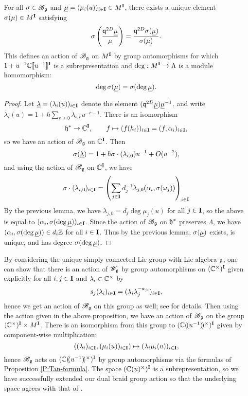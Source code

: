 \begin{proposition}\label{P:Bg-action-M}
    For all $\sigma\in\mathscr{B}_{\mathfrak{g}}$ and $\underline{\mu} = (\mu_i(u))_{i\in\mathbf{I}} \in M^{\mathbf{I}}$, there exists a unique element $\sigma(\mu)\in M^{\mathbf{I}}$ satisfying
    \[\sigma\left(\frac{\mathsf{q}^{2D}\underline{\mu}}{\underline{\mu}}\right) = \frac{\mathsf{q}^{2D}\sigma(\underline{\mu})}{\sigma(\underline{\mu})}.\]
    This defines an action of $\mathscr{B}_{\mathfrak{g}}$ on $M^{\mathbf{I}}$ by group automorphisms for which $1+u^{-1}\mathbb{C}[\![u^{-1}]\!]^{\mathbf{I}}$ is a subrepresentation and $\deg:M^{\mathbf{I}}\to\Lambda$ is a module homomorphism:
    \[\deg\sigma(\underline{\mu}) = \sigma(\deg\underline{\mu}).\]
\end{proposition}
\begin{proof}
    Let $\underline{\lambda} = (\lambda_i(u))_{i\in\mathbf{I}}$ denote the element $(\mathsf{q}^{2D}\underline{\mu})\underline{\mu}^{-1}$, and write $\lambda_i(u) = 1+\hbar\sum_{r\geq 0}\lambda_{i,r}u^{-r-1}$.
    There is an isomorphism
    \[\mathfrak{h}^*\to\mathbb{C}^{\mathbf{I}}, \qquad f\mapsto (f(h_i))_{i\in\mathbf{I}} = (f, \alpha_i)_{i\in\mathbf{I}},\]
    so we have an action of $\mathscr{B}_{\mathfrak{g}}$ on $\mathbb{C}^{\mathbf{I}}$.
    Then
    \[\sigma(\underline{\lambda}) = 1 + \hbar\sigma\cdot(\lambda_{i,0})u^{-1} + O(u^{-2}),\]
    and using the action of $\mathscr{B}_{\mathfrak{g}}$ on $\mathbb{C}^{\mathbf{I}}$, we have
    \[\sigma\cdot(\lambda_{i,0})_{i\in\mathbf{I}} = \left(\sum_{j\in\mathbf{I}}d_j^{-1}\lambda_{j,0}(\alpha_i,\sigma(\omega_j))\right)_{i\in\mathbf{I}}\]
    By the previous lemma, we have $\lambda_{j,0} = d_j\deg\mu_j(u)$ for all $j\in\mathbf{I}$, so the above is equal to $(\alpha_i,\sigma(\deg\underline{\mu}))_{i\in\mathbf{I}}$.
    Since the action of $\mathscr{B}_{\mathfrak{g}}$ on $\mathfrak{h}^*$ preserves $\Lambda$, we have $(\alpha_i,\sigma(\deg\underline{\mu}))\in d_i\mathbb{Z}$ for all $i\in\mathbf{I}$.
    Thus by the previous lemma, $\sigma(\underline{\mu})$ exists, is unique, and has degree $\sigma(\deg\underline{\mu})$.
\end{proof}

By considering the unique simply connected Lie group with Lie algebra $\mathfrak{g}$, one can show that there is an action of $\mathscr{W}_{\mathfrak{g}}$ by group automorphisms on $(\mathbb{C}^\times)^{\mathbf{I}}$ given explicitly for all $i,j\in\mathbf{I}$ and $\lambda_i\in\mathbb{C}^\times$ by
\[s_j(\lambda_i)_{i\in\mathbf{I}} = (\lambda_i\lambda_j^{-a_{ji}})_{i\in\mathbf{I}},\]
hence we get an action of $\mathscr{B}_{\mathfrak{g}}$ on this group as well; see \cite[Remark 4.5]{friesen_braid_2024} for details.
Then using the action given in the above proposition, we have an action of $\mathscr{B}_{\mathfrak{g}}$ on the group $(\mathbb{C}^\times)^{\mathbf{I}}\times M^{\mathbf{I}}$.
There is an isomorphism from this group to $(\mathbb{C}(\!(u^{-1})\!)^\times)^{\mathbf{I}}$ given by component-wise multiplication:
\[((\lambda_i)_{i\in\mathbf{I}}, (\mu_i(u))_{i\in\mathbf{I}}) \mapsto (\lambda_i\mu_i(u))_{i\in\mathbf{I}},\]
hence $\mathscr{B}_{\mathfrak{g}}$ acts on $(\mathbb{C}(\!(u^{-1})\!)^\times)^{\mathbf{I}}$ by group automorphisms via the formulas of Proposition \ref{P:Tan-formula}.
The space $(\mathbb{C}(u)^\times)^{\mathbf{I}}$ is a subrepresentation, so we have successfully extended our dual braid group action so that the underlying space agrees with that of \cite[Prop. 3.1]{tan_braid_2015}.


